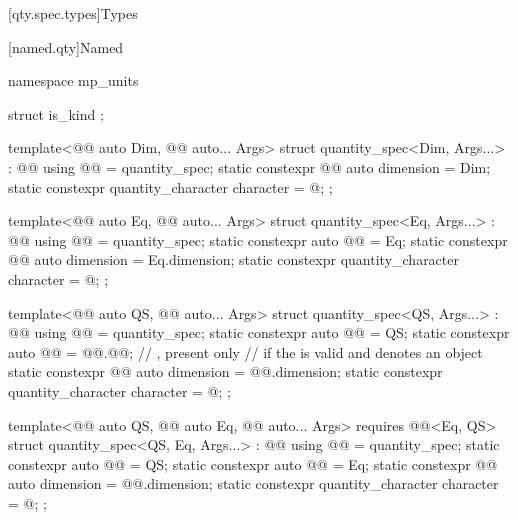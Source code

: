 [qty.spec.types]{Types}

[named.qty]{Named}

\begin{codeblock}
namespace mp_units {

struct is_kind {};

template<@@ auto Dim, @@ auto... Args>
struct quantity_spec<Dim, Args...> : @@ {
  using @@ = quantity_spec;
  static constexpr @@ auto dimension = Dim;
  static constexpr quantity_character character = @\seebelownc@;
};

template<@@ auto Eq, @@ auto... Args>
struct quantity_spec<Eq, Args...> : @@ {
  using @@ = quantity_spec;
  static constexpr auto @@ = Eq;
  static constexpr @@ auto dimension = Eq.dimension;
  static constexpr quantity_character character = @\seebelownc@;
};

template<@@ auto QS, @@ auto... Args>
struct quantity_spec<QS, Args...> : @@ {
  using @@ = quantity_spec;
  static constexpr auto @@ = QS;
  static constexpr auto @@ = @@.@@;  // \expos, present only
    // if the   is valid and denotes an object
  static constexpr @@ auto dimension = @@.dimension;
  static constexpr quantity_character character = @\seebelownc@;
};

template<@@ auto QS, @@ auto Eq, @@ auto... Args>
  requires @@<Eq, QS>
struct quantity_spec<QS, Eq, Args...> : @@ {
  using @@ = quantity_spec;
  static constexpr auto @@ = QS;
  static constexpr auto @@ = Eq;
  static constexpr @@ auto dimension = @@.dimension;
  static constexpr quantity_character character = @\seebelownc@;
};

}
\end{codeblock}

